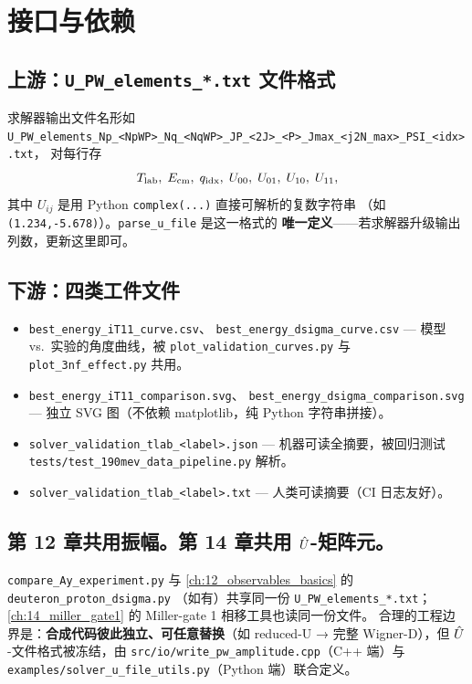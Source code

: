 \section{接口与依赖}
\label{sec:ch13-interface}

\subsection{上游：\texttt{U\_PW\_elements\_*.txt} 文件格式}
\label{subsec:ch13-upstream}

求解器输出文件名形如
\verb|U_PW_elements_Np_<NpWP>_Nq_<NqWP>_JP_<2J>_<P>_Jmax_<j2N_max>_PSI_<idx>.txt|，
对每行存
\begin{equation}
{T_{\text{lab}}},\; E_{\text{cm}},\; q_{\text{idx}},\;
U_{00},\; U_{01},\; U_{10},\; U_{11},
\end{equation}
其中 \(U_{ij}\) 是用 Python \texttt{complex(...)} 直接可解析的复数字符串
（如 \texttt{(1.234,-5.678)}）。\texttt{parse\_u\_file} 是这一格式的
\textbf{唯一定义}——若求解器升级输出列数，更新这里即可。

\subsection{下游：四类工件文件}
\label{subsec:ch13-downstream}

\begin{itemize}
  \item \texttt{best\_energy\_iT11\_curve.csv}、
        \texttt{best\_energy\_dsigma\_curve.csv} —
        模型 vs.\ 实验的角度曲线，被
        \texttt{plot\_validation\_curves.py} 与
        \texttt{plot\_3nf\_effect.py} 共用。
  \item \texttt{best\_energy\_iT11\_comparison.svg}、
        \texttt{best\_energy\_dsigma\_comparison.svg} —
        独立 SVG 图（不依赖 matplotlib，纯 Python 字符串拼接）。
  \item \texttt{solver\_validation\_tlab\_<label>.json} —
        机器可读全摘要，被回归测试
        \texttt{tests/test\_190mev\_data\_pipeline.py} 解析。
  \item \texttt{solver\_validation\_tlab\_<label>.txt} —
        人类可读摘要（CI 日志友好）。
\end{itemize}

\subsection{第 12 章共用振幅。第 14 章共用 \(\hat{U}\)-矩阵元。}
\texttt{compare\_Ay\_experiment.py} 与
\cref{ch:12_observables_basics} 的 \texttt{deuteron\_proton\_dsigma.py}
（如有）共享同一份 \texttt{U\_PW\_elements\_*.txt}；
\cref{ch:14_miller_gate1} 的 Miller-gate 1 相移工具也读同一份文件。
合理的工程边界是：\textbf{合成代码彼此独立、可任意替换}（如
reduced-U → 完整 Wigner-D），但 \(\hat{U}\)-文件格式被冻结，由
\texttt{src/io/write\_pw\_amplitude.cpp}（C++ 端）与
\texttt{examples/solver\_u\_file\_utils.py}（Python 端）联合定义。

